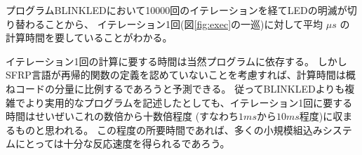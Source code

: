 プログラムBLINKLEDにおいて10000回のイテレーションを経てLEDの明滅が切り替わることから、
イテレーション1回(図\ref{fig:exec}の一巡)に対して平均
$  \mu s$
の計算時間を要していることがわかる。

イテレーション1回の計算に要する時間は当然プログラムに依存する。
しかしSFRP言語が再帰的関数の定義を認めていないことを考慮すれば、計算時間は概ねコードの分量に比例するであろうと予測できる。
従ってBLINKLEDよりも複雑でより実用的なプログラムを記述したとしても、イテレーション1回に要する時間はせいぜいこれの数倍から十数倍程度
(すなわち$1ms$から$10ms$程度)に収まるものと思われる。
この程度の所要時間であれば、多くの小規模組込みシステムにとっては十分な反応速度を得られるであろう。
